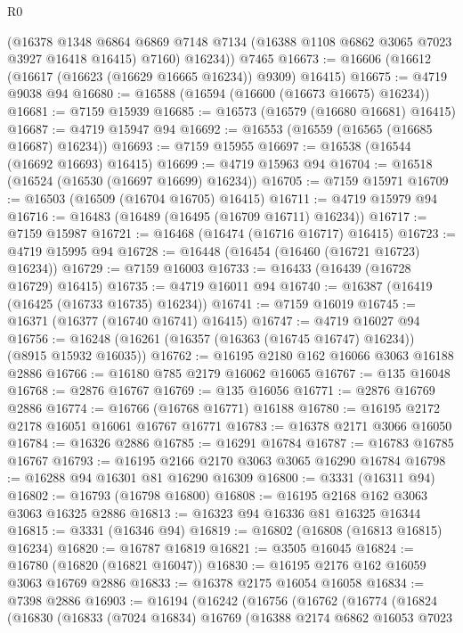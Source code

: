 \begin{lexlean}{R0}
\begin{coremodule}
        (@16378
          @1348
          @6864
          @6869
          @7148
          @7134
          (@16388 @1108 @6862 @3065 @7023 @3927 @16418 @16415)
          @7160)
        @16234))
    @7465
@16673 := @16606 (@16612 (@16617 (@16623 (@16629 @16665 @16234)) @9309) @16415)
@16675 := @4719 @9038 @94
@16680 := @16588 (@16594 (@16600 (@16673 @16675) @16234))
@16681 := @7159 @15939
@16685 := @16573 (@16579 (@16680 @16681) @16415)
@16687 := @4719 @15947 @94
@16692 := @16553 (@16559 (@16565 (@16685 @16687) @16234))
@16693 := @7159 @15955
@16697 := @16538 (@16544 (@16692 @16693) @16415)
@16699 := @4719 @15963 @94
@16704 := @16518 (@16524 (@16530 (@16697 @16699) @16234))
@16705 := @7159 @15971
@16709 := @16503 (@16509 (@16704 @16705) @16415)
@16711 := @4719 @15979 @94
@16716 := @16483 (@16489 (@16495 (@16709 @16711) @16234))
@16717 := @7159 @15987
@16721 := @16468 (@16474 (@16716 @16717) @16415)
@16723 := @4719 @15995 @94
@16728 := @16448 (@16454 (@16460 (@16721 @16723) @16234))
@16729 := @7159 @16003
@16733 := @16433 (@16439 (@16728 @16729) @16415)
@16735 := @4719 @16011 @94
@16740 := @16387 (@16419 (@16425 (@16733 @16735) @16234))
@16741 := @7159 @16019
@16745 := @16371 (@16377 (@16740 @16741) @16415)
@16747 := @4719 @16027 @94
@16756 := @16248 (@16261 (@16357 (@16363 (@16745 @16747) @16234)) (@8915 @15932 @16035))
@16762 := @16195 @2180 @162 @16066 @3063 @16188 @2886
@16766 := @16180 @785 @2179 @16062 @16065
@16767 := @135 @16048
@16768 := @2876 @16767
@16769 := @135 @16056
@16771 := @2876 @16769 @2886
@16774 := @16766 (@16768 @16771) @16188
@16780 := @16195 @2172 @2178 @16051 @16061 @16767 @16771
@16783 := @16378 @2171 @3066 @16050
@16784 := @16326 @2886
@16785 := @16291 @16784
@16787 := @16783 @16785 @16767
@16793 := @16195 @2166 @2170 @3063 @3065 @16290 @16784
@16798 := @16288 @94 @16301 @81 @16290 @16309
@16800 := @3331 (@16311 @94)
@16802 := @16793 (@16798 @16800)
@16808 := @16195 @2168 @162 @3063 @3063 @16325 @2886
@16813 := @16323 @94 @16336 @81 @16325 @16344
@16815 := @3331 (@16346 @94)
@16819 := @16802 (@16808 (@16813 @16815) @16234)
@16820 := @16787 @16819
@16821 := @3505 @16045
@16824 := @16780 (@16820 (@16821 @16047))
@16830 := @16195 @2176 @162 @16059 @3063 @16769 @2886
@16833 := @16378 @2175 @16054 @16058
@16834 := @7398 @2886
@16903 := @16194
    (@16242
      (@16756
        (@16762
          (@16774
            (@16824
              (@16830
                (@16833
                  (@7024 @16834)
                  @16769
                  (@16388
                    @2174
                    @6862
                    @16053
                    @7023

\end{coremodule}
\end{lexlean}
